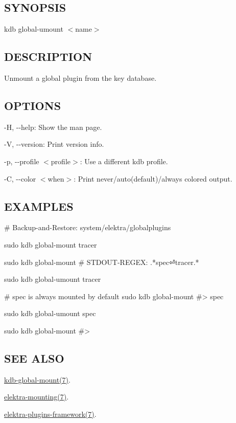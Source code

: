 \subsection*{S\+Y\+N\+O\+P\+S\+IS}

{\ttfamily kdb global-\/umount $<$name$>$}

\subsection*{D\+E\+S\+C\+R\+I\+P\+T\+I\+ON}

Unmount a global plugin from the key database.

\subsection*{O\+P\+T\+I\+O\+NS}


\begin{DoxyItemize}
\item {\ttfamily -\/H}, {\ttfamily -\/-\/help}\+: Show the man page.
\item {\ttfamily -\/V}, {\ttfamily -\/-\/version}\+: Print version info.
\item {\ttfamily -\/p}, {\ttfamily -\/-\/profile $<$profile$>$}\+: Use a different kdb profile.
\item {\ttfamily -\/C}, {\ttfamily -\/-\/color $<$when$>$}\+: Print never/auto(default)/always colored output.
\end{DoxyItemize}

\subsection*{E\+X\+A\+M\+P\+L\+ES}


\begin{DoxyCode}
# Backup-and-Restore: system/elektra/globalplugins

sudo kdb global-mount tracer

sudo kdb global-mount
# STDOUT-REGEX: .*spec⏎tracer.*

sudo kdb global-umount tracer

# spec is always mounted by default
sudo kdb global-mount
#> spec

sudo kdb global-umount spec

sudo kdb global-mount
#>
\end{DoxyCode}


\subsection*{S\+EE A\+L\+SO}


\begin{DoxyItemize}
\item \hyperlink{doc_help_kdb-global-mount_md}{kdb-\/global-\/mount(7)}.
\item \hyperlink{doc_help_elektra-mounting_md}{elektra-\/mounting(7)}.
\item \hyperlink{doc_dev_plugins-framework_md}{elektra-\/plugins-\/framework(7)}. 
\end{DoxyItemize}